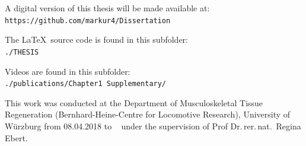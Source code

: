 \vspace*{\fill} %
\begin{center}
A digital version of this thesis will be made available at:\\
\texttt{https://github.com/markur4/Dissertation}

The \LaTeX~source code is found in this subfolder:\\
\texttt{./THESIS}

Videos are found in this subfolder:\\
\texttt{./publications/Chapter1 Supplementary/}

\vspace{\vdouble}

This work was conducted at the Department of Musculoskeletal Tissue
Regeneration (Bernhard-Heine-Centre for Locomotive Research), University
of Würzburg from 08.04.2018 to 
\DTMtoday~ under the supervision of Prof Dr.\,rer.\,nat.~Regina Ebert.
\end{center}


\thispagestyle{empty} %